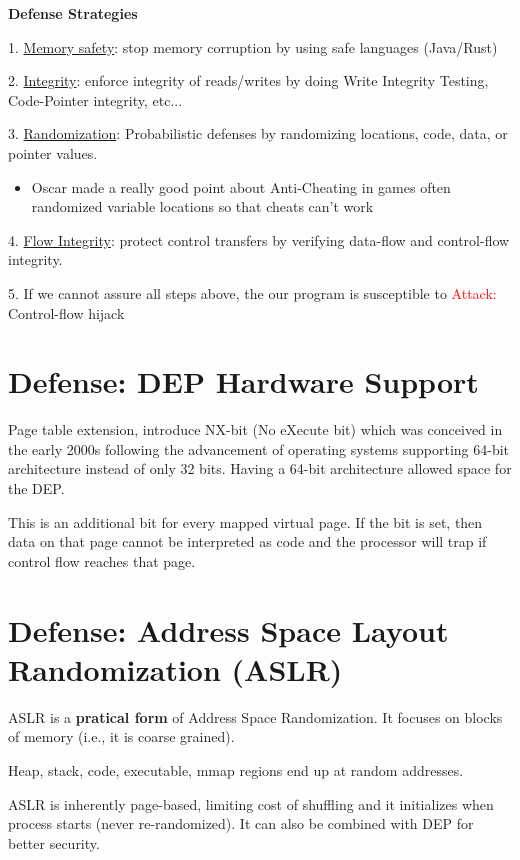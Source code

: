\documentclass[11pt]{article}
\begin{document}
\textbf{Defense Strategies}

1. \underline{Memory safety}: stop memory corruption by using safe languages (Java/Rust)

2. \underline{Integrity}: enforce integrity of reads/writes by doing Write Integrity Testing, Code-Pointer integrity, etc...

3. \underline{Randomization}: Probabilistic defenses by randomizing locations, code, data, or pointer values. 
\begin{itemize}
	\item Oscar made a really good point about Anti-Cheating in games often randomized variable locations so that cheats can't work
\end{itemize}

4. \underline{Flow Integrity}: protect control transfers by verifying data-flow and control-flow integrity.

5. If we cannot assure all steps above, the our program is susceptible to \textcolor{red}{Attack:} Control-flow hijack

\section*{Defense: DEP Hardware Support}

Page table extension, introduce NX-bit (No eXecute bit) which was conceived in the early 2000s following the advancement of operating systems supporting 64-bit architecture instead of only 32 bits. Having a 64-bit architecture allowed space for the DEP. 

This is an additional bit for every mapped virtual page. If the bit is set, then data on that page cannot be interpreted as code and the processor will trap if control flow reaches that page. 

\section*{Defense: Address Space \textbf{Layout} Randomization (ASLR)}

ASLR is a \textbf{pratical form} of Address Space Randomization. It focuses on blocks of memory (i.e., it is coarse grained). 

Heap, stack, code, executable, mmap regions end up at random addresses. 

ASLR is inherently page-based, limiting cost of shuffling and it initializes when process starts (never re-randomized). It can also be combined with DEP for better security. 
\end{document}

